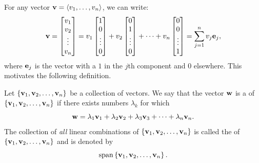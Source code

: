 For any vector \( \vb{v} = \left< v_1, \dots, v_n \right> \), we can write:
\[
\vb{v} = \begin{bmatrix}
    v_1\\
    v_2\\
    \vdots\\
    v_n
\end{bmatrix} = 
v_1 \begin{bmatrix}
    1\\
    0\\
    \vdots\\
    0
\end{bmatrix} +
v_2 \begin{bmatrix}
    0\\
    1\\
    \vdots\\
    0
\end{bmatrix} +
\cdots +
v_n \begin{bmatrix}
    0\\
    0\\
    \vdots\\
    1
\end{bmatrix}
= \sum_{j=1}^n v_j \vb{e}_j,
\]
where \( \vb{e}_j \) is the vector with a \( 1 \) in the \( j \)th component and \( 0 \) elsewhere. This motivates the following definition. 

\begin{dfn}
    Let \( \left\{ \vb{v}_{1}, \vb{v}_{2}, \dots, \vb{v}_{n} \right\} \) be a collection of vectors. We say that the vector \( \vb{w} \) is a  of \( \left\{ \vb{v}_{1}, \vb{v}_{2}, \dots, \vb{v}_{n} \right\} \) if there exists numbers \( \lambda_{k} \) for which 
    \[ \vb{w} = \lambda_{1} \vb{v}_{1} + \lambda_{2} \vb{v}_{2} + \lambda_{3} \vb{v}_{3} + \cdots + \lambda_{n} \vb{v}_{n}. \] The collection of \emph{all} linear combinations of  \( \left\{ \vb{v}_{1}, \vb{v}_{2}, \dots, \vb{v}_{n} \right\} \) is called the  of  \( \left\{ \vb{v}_{1}, \vb{v}_{2}, \dots, \vb{v}_{n} \right\} \) and is denoted by \[ \mathrm{span} \left\{ \vb{v}_{1}, \vb{v}_{2}, \dots, \vb{v}_{n} \right\}.  \]
\end{dfn}

